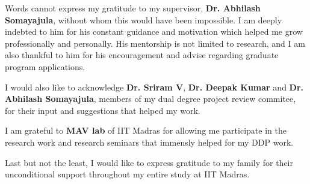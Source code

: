 \acknowledgements
Words cannot express my gratitude to my supervisor, {\bf Dr. Abhilash Somayajula}, 
without whom this would have been impossible. I am deeply indebted to him for 
his constant guidance and motivation which helped me grow professionally and 
personally. His mentorship is not limited to research, and I am also thankful 
to him for his encouragement and advise regarding graduate program applications.

I would also like to acknowledge {\bf Dr. Sriram V}, {\bf Dr. Deepak Kumar} and 
{\bf Dr. Abhilash Somayajula}, members of my dual degree project review commitee, for 
their input and suggestions that helped my work.

I am grateful to {\bf MAV lab} of IIT Madras for allowing me 
participate in the research work and research seminars that immensly helped 
for my DDP work.

Last but not the least, I would like to express gratitude to my family for 
their unconditional support throughout my entire study at IIT Madras.